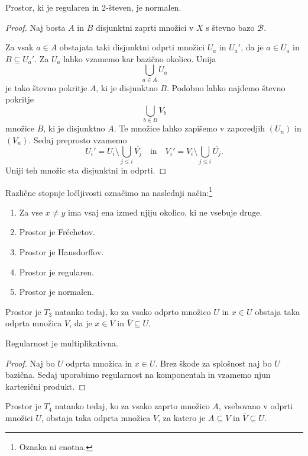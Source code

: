 \obvs

\begin{izrek}[Tikonov]
Prostor, ki je regularen in 2-števen, je normalen.
\end{izrek}

\begin{proof}
Naj bosta $A$ in $B$ disjunktni zaprti množici v $X$ s števno bazo
$\mathcal{B}$.

Za vsak $a \in A$ obstajata taki disjunktni odprti množici $U_a$ in
$U_a'$, da je $a \in U_a$ in $B \subseteq U_a'$. Za $U_a$ lahko
vzamemo kar bazično okolico. Unija
\[
\bigcup_{a \in A} U_a
\]
je tako števno pokritje $A$, ki je disjunktno $B$. Podobno lahko
najdemo števno pokritje
\[
\bigcup_{b \in B} V_b
\]
množice $B$, ki je disjunktno $A$. Te množice lahko zapišemo v
zaporedjih $(U_n)$ in $(V_n)$. Sedaj preprosto vzamemo
\[
U_i' = U_i \setminus \bigcup_{j \leq i} \overline{V_j}
\quad \text{in} \quad
V_i' = V_i \setminus \bigcup_{j \leq i} \overline{U_j}.
\]
Uniji teh množic sta disjunktni in odprti.
\end{proof}

\begin{definicija}
Različne stopnje ločljivosti označimo na naslednji način:\footnote{
Oznaka ni enotna.}

\begin{enumerate}[label=$T_{\arabic*}$:, start=0]
\item Za vse $x \ne y$ ima vsaj ena izmed njiju okolico, ki ne
vsebuje druge.
\item Prostor je Fréchetov.
\item Prostor je Hausdorffov.
\item Prostor je regularen.
\item Prostor je normalen.
\end{enumerate}
\end{definicija}

\begin{trditev}
Prostor je $T_3$ natanko tedaj, ko za vsako odprto množico $U$ in
$x \in U$ obstaja taka odprta množica $V$, da je $x \in V$ in
$\overline{V} \subseteq U$.
\end{trditev}

\obvs

\begin{trditev}
Regularnost je multiplikativna.
\end{trditev}

\begin{proof}
Naj bo $U$ odprta množica in $x \in U$. Brez škode za splošnost
naj bo $U$ bazična. Sedaj uporabimo regularnost na komponentah in
vzamemo njun kartezični produkt.
\end{proof}

\begin{trditev}
Prostor je $T_4$ natanko tedaj, ko za vsako zaprto množico $A$,
vsebovano v odprti množici $U$, obstaja taka odprta množica $V$,
za katero je $A \subseteq V$ in $\overline{V} \subseteq U$.
\end{trditev}

\obvs


